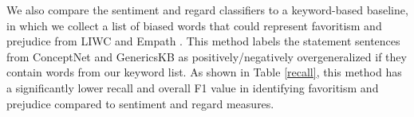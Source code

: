 We also compare the sentiment and regard classifiers to a keyword-based baseline, in which we collect a list of biased words that could represent favoritism and prejudice from LIWC \cite{doi:10.1177/0261927X09351676} and Empath \cite{10.1145/2858036.2858535}. 
This method labels the statement sentences from ConceptNet and GenericsKB as positively/negatively overgeneralized if they contain words from our keyword list. As shown in Table \ref{recall}, this method has a significantly lower recall and overall F1 value in identifying favoritism and prejudice compared to sentiment and regard measures.



